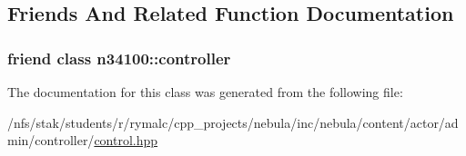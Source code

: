 \subsection{Friends And Related Function Documentation}
\hypertarget{classnebula_1_1content_1_1actor_1_1admin_1_1controller_1_1control_a73e093bffbf51077b70ffed7fb8078f3}{
\subsubsection[{n34100::controller}]{\setlength{\rightskip}{0pt plus 5cm}friend class {\bf n34100::controller}}}
\label{classnebula_1_1content_1_1actor_1_1admin_1_1controller_1_1control_a73e093bffbf51077b70ffed7fb8078f3}


The documentation for this class was generated from the following file:\begin{DoxyCompactItemize}
\item 
/nfs/stak/students/r/rymalc/cpp\_\-projects/nebula/inc/nebula/content/actor/admin/controller/\hyperlink{control_8hpp}{control.hpp}\end{DoxyCompactItemize}
